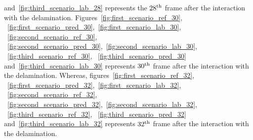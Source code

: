 and~\ref{fig:third_scenario_lab_28} represents the $28\textsuperscript{th}$ 
frame after the interaction with the delamination. 
Figures~\ref{fig:first_scenario_ref_30}, 
~\ref{fig:first_scenario_pred_30},~\ref{fig:first_scenario_lab_30},
~\ref{fig:second_scenario_ref_30}, 
~\ref{fig:second_scenario_pred_30},~\ref{fig:second_scenario_lab_30},
~\ref{fig:third_scenario_ref_30}, ~\ref{fig:third_scenario_pred_30} 
and~\ref{fig:third_scenario_lab_30} represents $30\textsuperscript{th}$ frame 
after the interaction with the delamination.
Whereas, figures~\ref{fig:first_scenario_ref_32}, 
~\ref{fig:first_scenario_pred_32},~\ref{fig:first_scenario_lab_32},
~\ref{fig:second_scenario_ref_32}, 
~\ref{fig:second_scenario_pred_32},~\ref{fig:second_scenario_lab_32},
~\ref{fig:third_scenario_ref_32}, ~\ref{fig:third_scenario_pred_32} 
and~\ref{fig:third_scenario_lab_32} represents $32\textsuperscript{th}$ frame 
after the interaction with the delamination.

